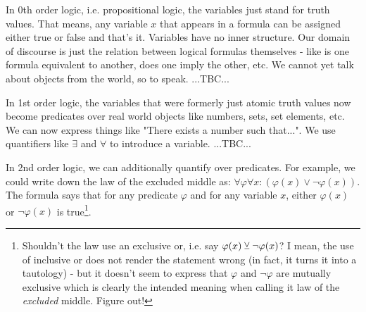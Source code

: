 \medskip
In 0th order logic, i.e. propositional logic, the variables just stand for truth values. That means, any variable $x$ that appears in a formula can be assigned either true or false and that's it. Variables have no inner structure. Our domain of discourse is just the relation between logical formulas themselves - like is one formula equivalent to another, does one imply the other, etc. We cannot yet talk about objects from the world, so to speak. ...TBC...


\medskip
In 1st order logic, the variables that were formerly just atomic truth values now become predicates over real world objects like numbers, sets, set elements, etc. We can now express things like "There exists a number such that...". We use quantifiers like $\exists$ and $\forall$ to introduce a variable. ...TBC...

\medskip
In 2nd order logic, we can additionally quantify over predicates. For example, we could write down the law of the excluded middle as: $\forall \varphi \forall x: (\varphi(x) \vee \neg \varphi(x))$. The formula says that for any predicate $\varphi$ and for any variable $x$, either $\varphi(x)$ or $\neg \varphi(x)$ is true\footnote{Shouldn't the law use an exclusive or, i.e. say $\varphi(x) \mathbin{\veebar} \neg \varphi(x)$? I mean, the use of inclusive or does not render the statement wrong (in fact, it turns it into a tautology) - but it doesn't seem to express that $\varphi$ and $\neg \varphi$ are mutually exclusive which is clearly the intended meaning when calling it law of the \emph{excluded} middle. Figure out!}.











